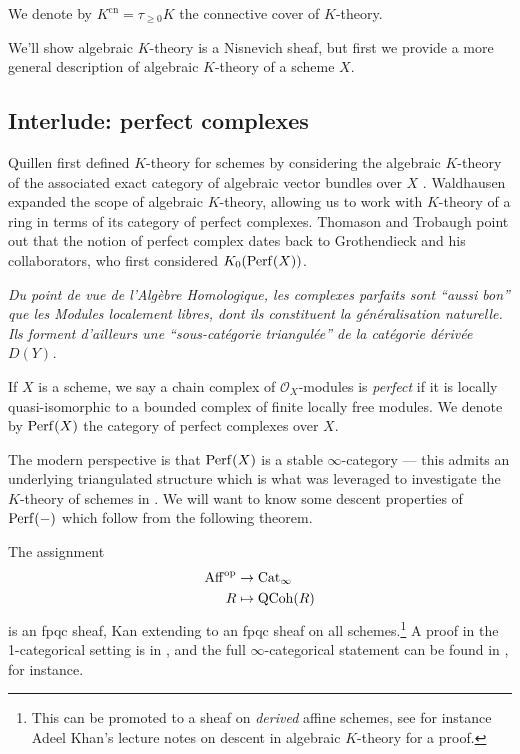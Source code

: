 \documentclass[11pt,openany]{book}
\providecommand{\cn}{\mathrm{cn}}
\newcommand{\quoteblock}[2]{\epigraph{\itshape#1}{#2}}
\begin{document}
\begin{notation} We denote by $K^\cn = \tau_{\ge 0} K$ the connective cover of $K$-theory.
\end{notation}

We'll show algebraic $K$-theory is a Nisnevich sheaf, but first we provide a more general description of algebraic $K$-theory of a scheme $X$.

\subsection{Interlude: perfect complexes}

Quillen first defined $K$-theory for schemes by considering the algebraic $K$-theory of the associated exact category of algebraic vector bundles over $X$ \cite[\S7]{Quillen-K1}. Waldhausen expanded the scope of algebraic $K$-theory, allowing us to work with $K$-theory of a ring in terms of its category of perfect complexes. Thomason and Trobaugh \cite{TT} point out that the notion of perfect complex dates back to Grothendieck and his collaborators, who first considered $K_0(\mathrm{Perf}(X))$.

\quoteblock{Du point de vue de l'Alg\`ebre Homologique,
les complexes parfaits sont ``aussi bon'' que les Modules localement libres, dont ils constituent la g\'en\'eralisation naturelle. Ils forment d'ailleurs une ``sous-cat\'egorie triangul\'ee'' de la cat\'egorie d\'eriv\'ee $D(Y)$.}{\cite[p.~6]{SGA6}}


\begin{definition} \cite[p.~11]{SGA6} If $X$ is a scheme, we say a chain complex of $\mathcal{O}_X$-modules is \textit{perfect} if it is locally quasi-isomorphic to a bounded complex of finite locally free modules. We denote by $\mathrm{Perf}(X)$ the category of perfect complexes over $X$.
\end{definition}

The modern perspective is that $\mathrm{Perf}(X)$ is a stable $\infty$-category --- this admits an underlying triangulated structure which is what was leveraged to investigate the $K$-theory of schemes in \cite{TT}. We will want to know some descent properties of $\mathrm{Perf}(-)$ which follow from the following theorem.

\begin{theorem}\label{thm:qcoh-fpqc-descent} 
The assignment
\begin{align*}
    \mathrm{Aff}^{\mathrm{op}} &\to \mathrm{Cat}_\infty \\
    R &\mapsto \mathrm{QCoh}(R)
\end{align*}
is an fpqc sheaf, Kan extending to an fpqc sheaf on all schemes.\footnote{This can be promoted to a sheaf on \textit{derived} affine schemes, see for instance Adeel Khan's lecture notes on descent in algebraic $K$-theory for a proof.} A proof in the 1-categorical setting is in \cite[04Q7]{Stacks}, and the full $\infty$-categorical statement can be found in \cite[D.6.3.1]{SAG}, for instance.
\end{theorem}
\end{document}

